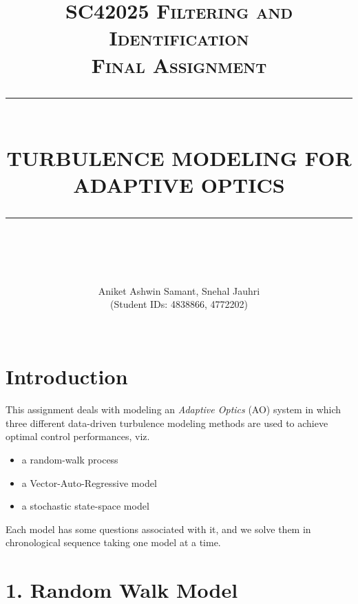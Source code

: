 \documentclass[12pt]{report}
\newcommand{\HRule}[1]{\rule{\linewidth}{#1}}
\begin{document}
\title{ \normalsize \textsc{SC42025 Filtering and Identification\\Final Assignment}
		\\ [2.0cm]
		\HRule{0.5pt} \\
		\LARGE \textbf{\uppercase{Turbulence Modeling for Adaptive Optics}}
		\HRule{2pt} \\ [0.5cm]
		\normalsize %
		\vspace*{5\baselineskip}}


\author{
		Aniket Ashwin Samant, Snehal Jauhri \\
		(Student IDs: 4838866, 4772202) \\ 
 \\ }

\maketitle
\tableofcontents
\newpage

\sectionfont{\scshape}


\section*{Introduction}

This assignment deals with modeling an \textit{Adaptive Optics} (AO) system in which three different data-driven turbulence modeling methods are used to achieve optimal control performances, viz.
\begin{itemize}
	\item a random-walk process
	\item a Vector-Auto-Regressive model
	\item a stochastic state-space model
\end{itemize}

Each model has some questions associated with it, and we solve them in chronological sequence taking one model at a time.


\section*{1. Random Walk Model}
\end{document}
